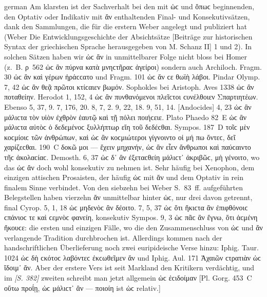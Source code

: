 \begin{otherlanguage*}{german}
Am klarsten ist der Sachverhalt bei den mit ὡϲ und ὅπωϲ beginnenden, den Optativ oder Indikativ mit ἄν enthaltenden Final- und Konsekutivsätzen, dank den Sammlungen, die für die erstern Weber angelegt und publiziert hat (Weber Die Entwicklungsgeschichte der Absichtsätze [Beiträge zur historischen Syntax der griechischen Sprache herausgegeben von M. Schanz II] 1 und 2). In solchen Sätzen haben wir ὡϲ ἄν in unmittelbarer Folge nicht bloss bei Homer (z.~B. ρ~562 ὡϲ ἂν πύρνα κατὰ μνηϲτῆραϲ ἀγείροι) sondern auch Archiloch. Fragm. 30 ὡϲ ἂν καὶ γέρων ἠράϲϲατο und Fragm. 101 ὡϲ ἄν ϲε θωϊὴ λάβοι. Pindar Olymp. 7, 42 ὡϲ ἂν θεᾷ πρῶτοι κτίϲαιεν βωμόν. Sophokles bei Aristoph. Aves 1338 ὡϲ ἂν ποταθείην. Herodot 1, 152, 4 ὡϲ ἂν πυνθανόμενοι πλεῖϲτοι ϲυνέλθοιεν Σπαρτιητέων. Ebenso 5, 37, 9. 7, 176, 20. 8, 7, 2. 9, 22, 18. 9, 51, 14. [Andocides] 4, 23 ὡϲ ἂν μάλιϲτα τὸν υἱὸν ἐχθρὸν ἑαυτῷ καὶ τῇ πόλει ποιήϲειε. Plato Phaedo 82~Ε ὡϲ ἂν μάλιϲτα αὐτὸϲ ὁ δεδεμένοϲ ξυλλήπτωρ εἴη τοῦ δεδέϲθαι. Sympos. 187~D τοῖϲ μὲν κοϲμίοιϲ τῶν ἀνθρώπων, καὶ ὡϲ ἂν κοϲμιώτεροι γίγνοιντο οἱ μή πω ὄντεϲ, δεῖ χαρίζεϲθαι. 190~C δοκῶ μοι — ἔχειν μηχανήν, ὡϲ ἂν εἶεν ἄνθρωποι καὶ παύϲαιντο τῆϲ ἀκολαϲίαϲ. Demosth. 6, 37 ὡϲ δ᾽ ἂν ἐξεταϲθείη μάλιϲτ᾽ ἀκριβῶϲ, μὴ γένοιτο, wo das ὡϲ ἄν doch wohl konsekutiv zu nehmen ist. Sehr häufig bei Xenophon, dem einzigen attischen Prosaisten, der häufig ὡϲ mit ἄν und dem Optativ in rein finalem Sinne verbindet. Von den siebzehn bei Weber S.~83~ff. aufgeführten Belegstellen haben vierzehn ἄν unmittelbar hinter ὡϲ, nur drei davon getrennt, final Cyrop. 5, 1, 18 ὡϲ μηδενὸϲ ἂν δέοιτο. 7, 5, 37 ὡϲ ὅτι ἥκιϲτα ἂν ἐπιφθόνοιϲ ϲπάνιοϲ τε καὶ ϲεμνὸϲ φανείη, konsekutiv Sympos. 9, 3 ὡϲ πᾶϲ ἂν ἔγνω, ὅτι ἀϲμένη ἤκουϲε: die ersten und einzigen Fälle, wo die den Zusammenschluss von ὡϲ und ἄν verlangende Tradition durchbrochen ist. Allerdings kommen nach der handschriftlichen Überlieferung noch zwei euripideische Verse hinzu: Iphig. Taur. 1024 ὡϲ δὴ ϲκότοϲ λαβόντεϲ ἐκϲωθεῖμεν ἄν und Iphig. Aul. 171 Ἀχαιῶν ϲτρατιὰν ὡϲ ἴδοιμ᾽ ἄν. Aber der erstere Vers ist seit Markland den Kritikern verdächtig, und im \hypertarget{p382}{\emph{[S. 382]}}\label{p382} zweiten schreibt man jetzt allgemein ὡϲ ἐϲιδοίμαν [Pl. Gorg. 453~C οὕτω προΐῃ, ὡϲ μάλιϲτ᾽ ἂν — ποιοίη ist ὡϲ relativ.]


\end{otherlanguage*}
